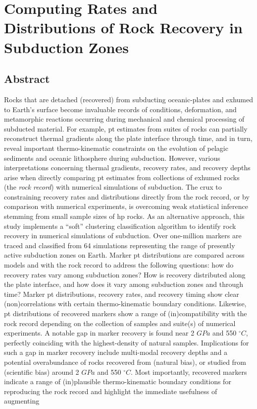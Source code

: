 \cleardoublepage

\hypertarget{chpt4}{%
\chapter{Computing Rates and Distributions of Rock Recovery in Subduction Zones}\label{chpt4}}


\hypertarget{chpt4Abstract}{%
\section{Abstract}\label{chpt4Abstract}}

Rocks that are detached (recovered) from subducting oceanic-plates and exhumed to Earth's surface become invaluable records of  conditions, deformation, and metamorphic reactions occurring during mechanical and chemical processing of subducted material. For example, \gls{pt} estimates from suites of  rocks can partially reconstruct thermal gradients along the plate interface through time, and in turn, reveal important thermo-kinematic constraints on the evolution of pelagic sediments and oceanic lithosphere during subduction. However, various interpretations concerning thermal gradients, recovery rates, and recovery depths arise when directly comparing \gls{pt} estimates from collections of exhumed rocks (the \emph{rock record}) with numerical simulations of subduction. The crux to constraining recovery rates and distributions directly from the rock record, or by comparison with numerical experiments, is overcoming weak statistical inference stemming from small sample sizes of \gls{hp} rocks. As an alternative approach, this study implements a ``soft'' clustering classification algorithm to identify rock recovery in numerical simulations of subduction. Over one-million markers are traced and classified from 64 simulations representing the range of presently active subduction zones on Earth. Marker \gls{pt} distributions are compared across models and with the rock record to address the following questions: how do recovery rates vary among subduction zones? How is recovery distributed along the plate interface, and how does it vary among subduction zones and through time? Marker \gls{pt} distributions, recovery rates, and recovery timing show clear (non)correlations with certain thermo-kinematic boundary conditions. Likewise, \gls{pt} distributions of recovered markers show a range of (in)compatibility with the rock record depending on the collection of samples and suite(s) of numerical experiments. A notable gap in marker recovery is found near 2 \(GPa\) and 550 \(^\circ C\), perfectly coinciding with the highest-density of natural samples. Implications for such a gap in marker recovery include multi-modal recovery depths and a potential overabundance of rocks recovered from (natural bias), or studied from (scientific bias) around 2 \(GPa\) and 550 \(^\circ C\). Most importantly, recovered markers indicate a range of (in)plausible thermo-kinematic boundary conditions for reproducing the rock record and highlight the immediate usefulness of augmenting 